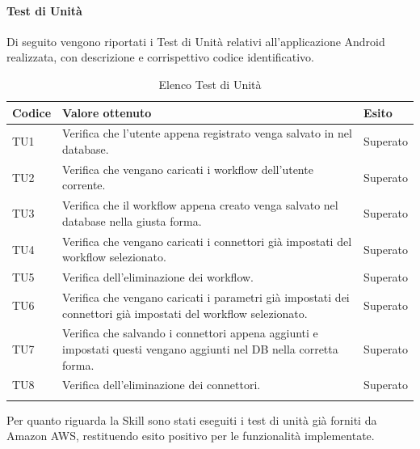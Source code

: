 \paragraph{Test di Unità}
\label{sec:tuRA}
Di seguito vengono riportati i Test di Unità relativi all'applicazione Android realizzata, con descrizione e corrispettivo codice identificativo.
\begin{center}
	\centering
	\renewcommand{\arraystretch}{1.5}
	\begin{longtable}{  p{1.5cm}  p{10.5cm} p{2cm}  }
		\rowcolor{tableHeadYellow}
		\textbf{Codice}   & \textbf{Valore ottenuto} & \textbf{Esito} \\ 
		\endhead
		TU1 & Verifica che l’utente appena registrato venga salvato in nel database.  & Superato \\
		TU2 & Verifica che vengano caricati i workflow dell’utente corrente. & Superato \\
		TU3 & Verifica che il workflow appena creato venga salvato nel database nella giusta forma. & Superato \\
		TU4 & Verifica che vengano caricati i connettori già impostati del workflow selezionato. & Superato \\
		TU5 & Verifica dell’eliminazione dei workflow. & Superato \\
		TU6 & Verifica che vengano caricati i parametri già impostati dei connettori già impostati del workflow selezionato. & Superato \\
		TU7 & Verifica che salvando i connettori appena aggiunti e impostati questi vengano aggiunti nel DB nella corretta forma. & Superato \\
		TU8 & Verifica dell’eliminazione dei connettori. & Superato \\
		\rowcolor{white}
		\caption{Elenco Test di Unità}
	\end{longtable}
\end{center}
Per quanto riguarda la Skill sono stati eseguiti i test di unità già forniti da Amazon AWS, restituendo esito positivo per le funzionalità implementate.
